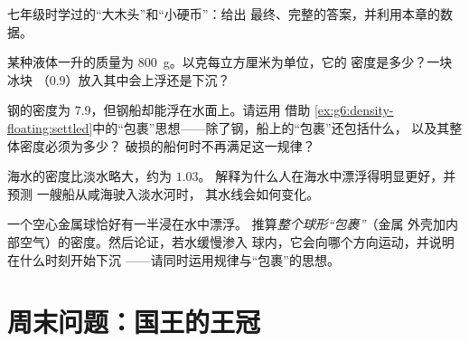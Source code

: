 \begin{exercise}[$\star$]\label{exo:g6:density-floating:8}
七年级时学过的“大木头”和“小硬币”：给出
最终、完整的答案，并利用本章的数据。
\end{exercise}

\begin{exercise}[$\star\star$]\label{exo:g6:density-floating:9}
某种液体一升的质量为 \qty{800}{g}。以克每立方厘米为单位，它的
密度是多少？一块冰块
（$0.9$）放入其中会上浮还是下沉？
\end{exercise}

\begin{exercise}[$\star\star$]\label{exo:g6:density-floating:10}
钢的密度为 $7.9$，但钢船却能浮在水面上。请运用
借助
\cref{ex:g6:density-floating:settled}中的“包裹”思想——除了钢，船上的“包裹”还包括什么，
以及其整体密度必须为多少？
破损的船何时不再满足这一规律？
\end{exercise}

\begin{exercise}[$\star\star$]\label{exo:g6:density-floating:11}
海水的密度比淡水略大，约为 $1.03$。
解释为什么人在海水中漂浮得明显更好，并预测
一艘船从咸海驶入淡水河时，
其水线会如何变化。
\end{exercise}

\begin{exercise}[$\star\star\star$]\label{exo:g6:density-floating:12}
一个空心金属球恰好有一半浸在水中漂浮。
推算\emph{整个球形“包裹”}（金属
外壳加内部空气）的密度。然后论证，若水缓慢渗入
球内，它会向哪个方向运动，并说明在什么时刻开始下沉
——请同时运用规律与“包裹”的思想。
\end{exercise}

\section{周末问题：国王的王冠}


